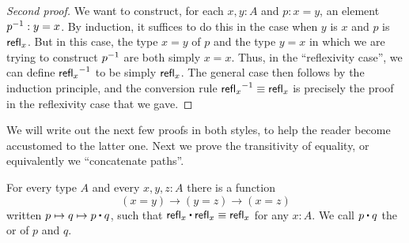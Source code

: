 \begin{proof}[Second proof]
  We want to construct, for each $x,y:A$ and $p:x=y$, an element $\mathord{{p}^{-1}}:y=x$.
  By induction, it suffices to do this in the case when $y$ is $x$ and $p$ is $\mathsf{refl}_{x}$.
  But in this case, the type $x=y$ of $p$ and the type $y=x$ in which we are trying to construct $\mathord{{p}^{-1}}$ are both simply $x=x$.
  Thus, in the ``reflexivity case'', we can define $\mathord{{\mathsf{refl}_{x}}^{-1}}$ to be simply $\mathsf{refl}_{x}$.
  The general case then follows by the induction principle, and the conversion rule $\mathord{{\mathsf{refl}_{x}}^{-1}}\equiv\mathsf{refl}_{x}$ is precisely the proof in the reflexivity case that we gave.
\end{proof}

We will write out the next few proofs in both styles, to help the reader become accustomed to the latter one.
Next we prove the transitivity of equality, or equivalently we ``concatenate paths''.

\begin{lem}\label{lem:concat}
  For every type $A$ and every $x,y,z:A$ there is a function
  \begin{equation*}
  (x= y) \to   (y= z)\to (x=  z)
  \end{equation*}
  written $p \mapsto q \mapsto p\ct q$, such that $\refl{x}\ct \refl{x}\jdeq \refl{x}$ for any $x:A$.
  We call $p\ct q$ the  or  of $p$ and $q$.
\end{lem}


